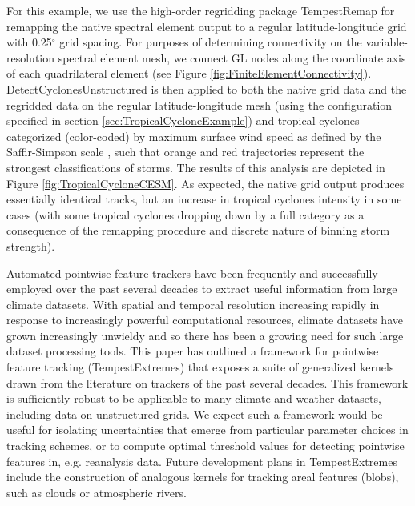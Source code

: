 \documentclass[gmdd, hvmath, online]{copernicus_discussions}
\begin{document}
For this example, we use the high-order regridding package TempestRemap \citep{ullrich2015arbitrary, ullrich2016arbitrary} for remapping the native spectral element output to a regular latitude-longitude grid with 0.25$^\circ$ grid spacing.  For purposes of determining connectivity on the variable-resolution spectral element mesh, we connect GL nodes along the coordinate axis of each quadrilateral element (see Figure \ref{fig:FiniteElementConnectivity}).  DetectCyclonesUnstructured is then applied to both the native grid data and the regridded data on the regular latitude-longitude mesh (using the configuration specified in section \ref{sec:TropicalCycloneExample}) and tropical cyclones categorized (color-coded) by maximum surface wind speed as defined by the Saffir-Simpson scale \citep{Simpson1974}, such that orange and red trajectories represent the strongest classifications of storms.  The results of this analysis are depicted in Figure \ref{fig:TropicalCycloneCESM}.  As expected, the native grid output produces essentially identical tracks, but an increase in tropical cyclones intensity in some cases (with some tropical cyclones dropping down by a full category as a consequence of the remapping procedure and discrete nature of binning storm strength).

\conclusions \label{sec:Conclusions}

Automated pointwise feature trackers have been frequently and successfully employed over the past several decades to extract useful information from large climate datasets.  With spatial and temporal resolution increasing rapidly in response to increasingly powerful computational resources, climate datasets have grown increasingly unwieldy and so there has been a growing need for such large dataset processing tools.  This paper has outlined a framework for pointwise feature tracking (TempestExtremes) that exposes a suite of generalized kernels drawn from the literature on trackers of the past several decades.  This framework is sufficiently robust to be applicable to many climate and weather datasets, including data on unstructured grids.  We expect such a framework would be useful for isolating uncertainties that emerge from particular parameter choices in tracking schemes, or to compute optimal threshold values for detecting pointwise features in, e.g. reanalysis data.  Future development plans in TempestExtremes include the construction of analogous kernels for tracking areal features (blobs), such as clouds or atmospheric rivers.

\end{document}
